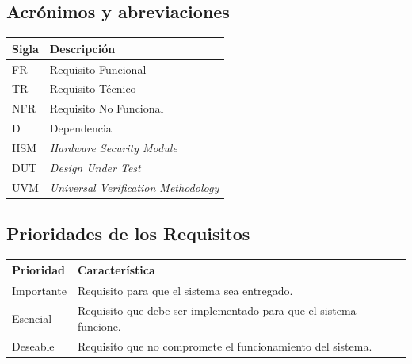 \documentclass[a4paper]{article}
\begin{document}
  \subsection{Acrónimos y abreviaciones}
    \FloatBarrier
    \begin{table}[H]
      \begin{center}
        \begin{tabular}[pos]{|m{2cm} | m{12cm}|} 
          \hline
          \cellcolor[gray]{0.9}\textbf{Sigla} & \cellcolor[gray]{0.9}\textbf{Descripción} \\ \hline
          FR      & Requisito Funcional  \\ \hline
          TR      & Requisito Técnico  \\ \hline
          NFR     & Requisito No Funcional  \\ \hline
          D       & Dependencia  \\ \hline
          HSM     & \textit{Hardware Security Module} \\ \hline
          DUT     & \textit{Design Under Test} \\ \hline
          UVM     & \textit{Universal Verification Methodology} \\ \hline
        \end{tabular}
      \end{center}
    \end{table}  

  \subsection{Prioridades de los Requisitos}
    \FloatBarrier
    \begin{table}[H]
      \begin{center}
        \begin{tabular}[pos]{|m{2cm} | m{12cm}|} 
          \hline
          \cellcolor[gray]{0.9}\textbf{Prioridad} & \cellcolor[gray]{0.9}\textbf{Característica} \\ \hline
          Importante     & Requisito para que el sistema sea entregado.  \\ \hline
          Esencial       & Requisito que debe ser implementado para que el sistema funcione.  \\ \hline
          Deseable       & Requisito que no compromete el funcionamiento del sistema.  \\ \hline
        \end{tabular}
      \end{center}
    \end{table}  
\end{document}
